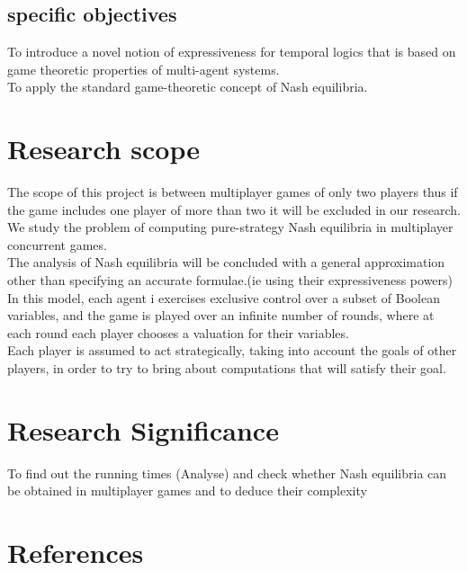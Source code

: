 \documentclass[14pt, a4paper]{article}
\begin{document}
				
				\subsection{specific objectives}
						To introduce a novel notion of expressiveness for temporal logics that is based on game theoretic properties of multi-agent systems.\\
		To apply the standard game-theoretic concept of Nash equilibria.\\

			
			\section{Research scope}
			
				The scope of this project is between multiplayer games of only two players thus if the game includes one player of more than two it will be excluded in our research.\\
	We study the problem of computing pure-strategy Nash equilibria in multiplayer concurrent games.\\
	The analysis of Nash equilibria will be concluded with a general approximation other than specifying an accurate formulae.(ie using their expressiveness powers)\\

	In this model, each agent i exercises exclusive control over a subset of Boolean variables, and the game is played over an infinite number of rounds, where at each round each player chooses a valuation for their variables.\\

	Each player is assumed to act strategically, taking into account the goals of other players,
in order to try to bring about computations that will satisfy their goal.\\

			
			\section{Research Significance}
			
				To find out the running times (Analyse) and check whether Nash equilibria can be obtained in multiplayer games and to deduce their complexity

			
			\section{References}

				
	

	
\end{document}
